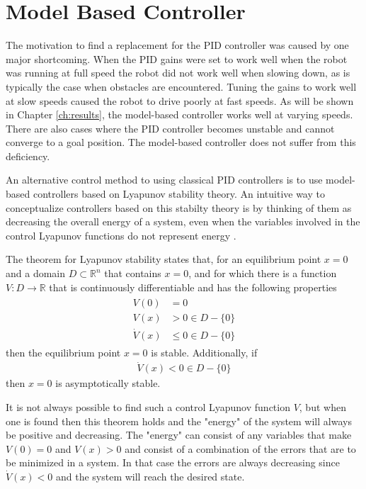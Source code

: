 \section{Model Based Controller}
\label{sec:lyapunov}
The motivation to find a replacement for the PID controller was caused by one major shortcoming. When the PID gains were set to work well when the robot was running at full speed the robot did not work well when slowing down, as is typically the case when obstacles are encountered. Tuning the gains to work well at slow speeds caused the robot to drive poorly at fast speeds. As will be shown in Chapter \ref{ch:results}, the model-based controller works well at varying speeds. There are also cases where the PID controller becomes unstable and cannot converge to a goal position. The model-based controller does not suffer from this deficiency.

An alternative control method to using classical PID controllers is to use model-based controllers based on Lyapunov stability theory. An intuitive way to conceptualize controllers based on this stabilty theory is by thinking of them as decreasing the overall energy of a system, even when the variables involved in the control Lyapunov functions do not represent energy \cite{Khalil02}.

The theorem for Lyapunov stability states that, for an equilibrium point $x=0$ and a domain $D\subset\mathbb{R}^n$ that contains $x=0$, and for which there is a function $V:D\to\mathbb{R}$ that is continuously differentiable and has the following properties 
\begin{align}
\label{eq:lyapunovTheorem}
\begin{split}
V(0) &= 0 \\
V(x) &> 0 \in D-\{0\} \\
\dot{V}(x) &\leq 0 \in D-\{0\}
\end{split}
\end{align}
then the equilibrium point $x=0$ is stable. Additionally, if
\begin{align}
\label{eq:lyapunovAsymptoticStability}
\dot{V}(x) < 0 \in D - \{0\}
\end{align}
then $x=0$ is asymptotically stable.

It is not always possible to find such a control Lyapunov function $V$, but when one is found then this theorem holds and the "energy" of the system will always be positive and decreasing. The "energy" can consist of any variables that make $V(0) = 0$ and $V(x) > 0$ and consist of a combination of the errors that are to be minimized in a system. In that case the errors are always decreasing since $\dot{V}(x) < 0$ and the system will reach the desired state.

